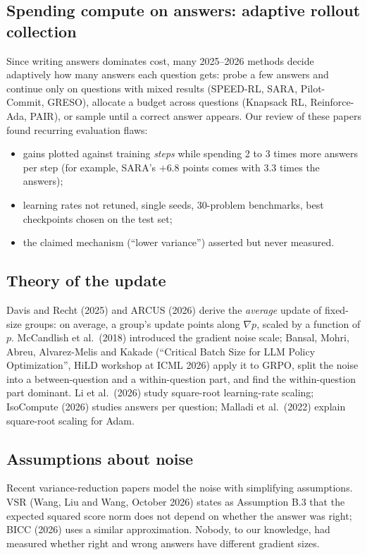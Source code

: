 \documentclass[11pt]{article}
\begin{document}
\subsection{Spending compute on answers: adaptive rollout collection}
Since writing answers dominates cost, many 2025--2026 methods decide adaptively how many answers each question gets: probe a few answers and continue only on questions with mixed results (SPEED-RL, SARA, Pilot-Commit, GRESO), allocate a budget across questions (Knapsack RL, Reinforce-Ada, PAIR), or sample until a correct answer appears. Our review of these papers found recurring evaluation flaws:
\begin{itemize}[leftmargin=*,itemsep=1pt]
\item gains plotted against training \emph{steps} while spending 2 to 3 times more answers per step (for example, SARA's $+6.8$ points comes with 3.3 times the answers);
\item learning rates not retuned, single seeds, 30-problem benchmarks, best checkpoints chosen on the test set;
\item the claimed mechanism (``lower variance'') asserted but never measured.
\end{itemize}

\subsection{Theory of the update}
Davis and Recht (2025) and ARCUS (2026) derive the \emph{average} update of fixed-size groups: on average, a group's update points along $\nabla p$, scaled by a function of $p$. McCandlish et al.\ (2018) introduced the gradient noise scale; Bansal, Mohri, Abreu, Alvarez-Melis and Kakade (``Critical Batch Size for LLM Policy Optimization'', HiLD workshop at ICML 2026) apply it to GRPO, split the noise into a between-question and a within-question part, and find the within-question part dominant. Li et al.\ (2026) study square-root learning-rate scaling; IsoCompute (2026) studies answers per question; Malladi et al.\ (2022) explain square-root scaling for Adam.

\subsection{Assumptions about noise}
Recent variance-reduction papers model the noise with simplifying assumptions. VSR (Wang, Liu and Wang, October 2026) states as Assumption B.3 that the expected squared score norm does not depend on whether the answer was right; BICC (2026) uses a similar approximation. Nobody, to our knowledge, had measured whether right and wrong answers have different gradient sizes.
\end{document}

